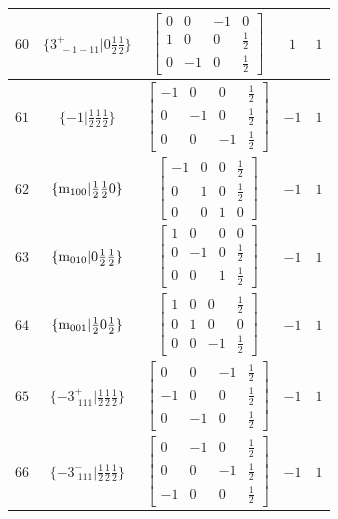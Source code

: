\documentclass[fleqn,8pt]{jsarticle}
\begin{document}
\begin{longtable}{ccccc}
$ 60 $ & $ \{3^{+}_{\,\,-1-11}|0 \frac{1}{2} \frac{1}{2}\} $ & $ \begin{bmatrix} 0 & 0 & -1 & 0 \\ 1 & 0 & 0 & \frac{1}{2} \\ 0 & -1 & 0 & \frac{1}{2} \end{bmatrix} $ & $ 1 $ & $ 1 $ \\ \hline
$ 61 $ & $ \{-1|\frac{1}{2} \frac{1}{2} \frac{1}{2}\} $ & $ \begin{bmatrix} -1 & 0 & 0 & \frac{1}{2} \\ 0 & -1 & 0 & \frac{1}{2} \\ 0 & 0 & -1 & \frac{1}{2} \end{bmatrix} $ & $ -1 $ & $ 1 $ \\ \hline
$ 62 $ & $ \{{\rm m}_{100}|\frac{1}{2} \frac{1}{2} 0\} $ & $ \begin{bmatrix} -1 & 0 & 0 & \frac{1}{2} \\ 0 & 1 & 0 & \frac{1}{2} \\ 0 & 0 & 1 & 0 \end{bmatrix} $ & $ -1 $ & $ 1 $ \\ \hline
$ 63 $ & $ \{{\rm m}_{010}|0 \frac{1}{2} \frac{1}{2}\} $ & $ \begin{bmatrix} 1 & 0 & 0 & 0 \\ 0 & -1 & 0 & \frac{1}{2} \\ 0 & 0 & 1 & \frac{1}{2} \end{bmatrix} $ & $ -1 $ & $ 1 $ \\ \hline
$ 64 $ & $ \{{\rm m}_{001}|\frac{1}{2} 0 \frac{1}{2}\} $ & $ \begin{bmatrix} 1 & 0 & 0 & \frac{1}{2} \\ 0 & 1 & 0 & 0 \\ 0 & 0 & -1 & \frac{1}{2} \end{bmatrix} $ & $ -1 $ & $ 1 $ \\ \hline
$ 65 $ & $ \{-3^{+}_{\,\,111}|\frac{1}{2} \frac{1}{2} \frac{1}{2}\} $ & $ \begin{bmatrix} 0 & 0 & -1 & \frac{1}{2} \\ -1 & 0 & 0 & \frac{1}{2} \\ 0 & -1 & 0 & \frac{1}{2} \end{bmatrix} $ & $ -1 $ & $ 1 $ \\ \hline
$ 66 $ & $ \{-3^{-}_{\,\,111}|\frac{1}{2} \frac{1}{2} \frac{1}{2}\} $ & $ \begin{bmatrix} 0 & -1 & 0 & \frac{1}{2} \\ 0 & 0 & -1 & \frac{1}{2} \\ -1 & 0 & 0 & \frac{1}{2} \end{bmatrix} $ & $ -1 $ & $ 1 $ \\ \hline

\end{longtable}
\end{document}
